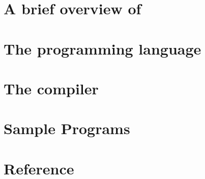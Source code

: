\documentclass[twoside]{axiom}
\begin{document}


\cleardoublepage



\cleardoublepage
%
\summarycontents
\cleardoublepage
\tableofcontents
\listoffigures
\cleardoublepage

\part{A brief overview of \asharp{}}




\part{The \asharp{} programming language}


\part{The \asharp{} compiler}



%



%

\part{Sample Programs}
%
%


\part{Reference}

%
%



%


\printindex
\end{document}
